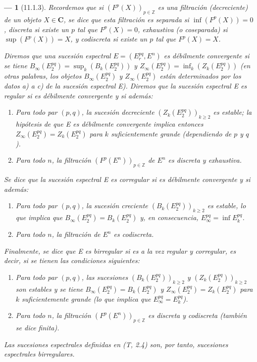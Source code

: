 \documentclass[10pt,oneside,openany]{book}
\theoremstyle{egaenv}\newtheorem*{env}{---}
\theoremstyle{egastatement}
\theoremstyle{egadescription}
\newcommand{\oldpage}[2][]{\marginnote{\normalfont\scriptsize\textbf{#1}\,|\,#2}\ignorespaces}
\renewcommand{\geq}{\geqslant}
\begin{document}
\begin{env}[11.1.3]
\label{0.11.1.3}
\label{0.11.1.3-fr}
\oldpage[0\textsubscript{III}]{25}
Recordemos que si $(F^p(X))_{p\in\mathbb Z}$ es una \emph{filtración} (decreciente) de un objeto $X\in\boldsymbol{C}$, se dice que esta filtración es \emph{separada} si $\inf(F^p(X))=0$, \emph{discreta} si existe un $p$ tal que $F^p(X)=0$, \emph{exhaustiva} (o \emph{coseparada}) si $\sup(F^p(X))=X$, y \emph{codiscreta} si existe un $p$ tal que $F^p(X)=X$.

Diremos que una sucesión espectral $E=(E_r^{pq},E^n)$ es \emph{débilmente convergente} si se tiene $B_\infty(E_2^{pq})=\sup_k(B_k(E_2^{pq}))$ y $Z_\infty(E_2^{pq})=\inf_k(Z_k(E_2^{pq}))$ (en otras palabras, los objetos $B_\infty(E_2^{pq})$ y $Z_\infty(E_2^{pq})$ están determinados por los datos \emph{a)} a \emph{c)} de la sucesión espectral E). Diremos que la sucesión espectral E es \emph{regular} si es débilmente convergente y si además:
\begin{enumerate}
  \item[$1^\circ$] Para todo par $(p,q)$, la sucesión decreciente $(Z_k(E_2^{pq}))_{k\geq2}$ es \emph{estable}; la hipótesis de que E es débilmente convergente implica entonces
$Z_\infty(E_2^{pq})=Z_k(E_2^{pq})$ para $k$ suficientemente grande (dependiendo de $p$ y $q$).
  \item[$2^\circ$] Para todo $n$, la filtración $(F^p(E^n))_{p\in\mathbb Z}$ de $E^n$ es \emph{discreta} y \emph{exhaustiva}.
\end{enumerate}

Se dice que la sucesión espectral E es \emph{corregular} si es débilmente convergente y si además:
\begin{enumerate}
  \item[$3^\circ$] Para todo par $(p,q)$, la sucesión creciente $(B_k(E_2^{pq}))_{k\geq2}$ es \emph{estable}, lo que implica que $B_\infty(E_2^{pq})=B_k(E_2^{pq})$ y, en consecuencia, $E_\infty^{pq}=\inf E_k^{pq}$.
  \item[$4^\circ$] Para todo $n$, la filtración de $E^n$ es \emph{codiscreta}.
\end{enumerate}

Finalmente, se dice que E es \emph{birregular} si es a la vez regular y corregular, es decir, si se tienen las condiciones siguientes:
\begin{enumerate}
  \item[\textit{a)}] Para todo par $(p,q)$, las sucesiones $(B_k(E_2^{pq}))_{k\geq2}$ y $(Z_k(E_2^{pq}))_{k\geq2}$ son \emph{estables} y se tiene $B_\infty(E_2^{pq})=B_k(E_2^{pq})$ y $Z_\infty(E_2^{pq})=Z_k(E_2^{pq})$ para $k$ suficientemente grande (lo que implica que $E_\infty^{pq}=E_k^{pq}$).
  \item[\textit{(b)}] Para todo $n$, la filtración $(F^p(E^n))_{p\in\mathbb Z}$ es \emph{discreta} y \emph{codiscreta} (también se dice \emph{finita}).
\end{enumerate}

Las sucesiones espectrales definidas en (T, 2.4) son, por tanto, sucesiones espectrales birregulares.
\end{env}
\end{document}
